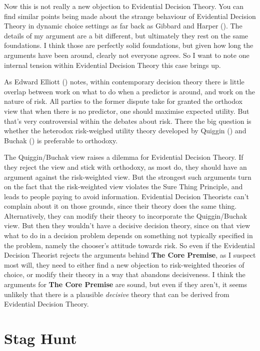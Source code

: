 \documentclass[
  10pt,
  letterpaper,
  DIV=11,
  numbers=noendperiod,
  twoside]{scrartcl}
\begin{document}
Now this is not really a new objection to Evidential Decision Theory.
You can find similar points being made about the strange behaviour of
Evidential Decision Theory in dynamic choice settings as far back as
Gibbard and Harper (). The details
of my argument are a bit different, but ultimately they rest on the same
foundations. I think those are perfectly solid foundations, but given
how long the arguments have been around, clearly not everyone agrees. So
I want to note one internal tension within Evidential Decision Theory
this case brings up.

As Edward Elliott () notes, within
contemporary decision theory there is little overlap between work on
what to do when a predictor is around, and work on the nature of risk.
All parties to the former dispute take for granted the orthodox view
that when there is no predictor, one should maximise expected utility.
But that's very controversial within the debates about risk. There the
big question is whether the heterodox risk-weighed utility theory
developed by Quiggin () and Buchak
() is preferable to orthodoxy.

The Quiggin/Buchak view raises a dilemma for Evidential Decision Theory.
If they reject the view and stick with orthodoxy, as most do, they
should have an argument against the risk-weighted view. But the
strongest such arguments turn on the fact that the risk-weighted view
violates the Sure Thing Principle, and leads to people paying to avoid
information. Evidential Decision Theorists can't complain about it on
those grounds, since their theory does the same thing. Alternatively,
they can modify their theory to incorporate the Quiggin/Buchak view. But
then they wouldn't have a decisive decision theory, since on that view
what to do in a decision problem depends on something not typically
specified in the problem, namely the chooser's attitude towards risk. So
even if the Evidential Decision Theorist rejects the arguments behind
\textbf{The Core Premise}, as I suspect most will, they need to either
find a new objection to risk-weighted theories of choice, or modify
their theory in a way that abandons decisiveness. I think the arguments
for \textbf{The Core Premise} are sound, but even if they aren't, it
seems unlikely that there is a plausible \emph{decisive} theory that can
be derived from Evidential Decision Theory.

\section{Stag Hunt}\label{stag-hunt}
\end{document}
